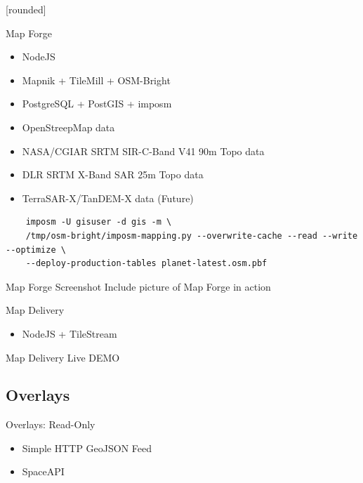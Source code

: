 \documentclass{beamer}
\newcommand\Fontvi{\fontsize{6}{7.2}\selectfont}
\begin{document}
[rounded]
\begin{frame}[fragile]{Map Forge}
 \begin{itemize}
  \item NodeJS
  \item Mapnik + TileMill + OSM-Bright
  \item PostgreSQL + PostGIS + imposm
  \item OpenStreepMap data
  \item NASA/CGIAR SRTM SIR-C-Band V41 90m Topo data
  \item DLR SRTM X-Band SAR 25m Topo data
  \item TerraSAR-X/TanDEM-X data (Future)
 \end{itemize}
\Fontvi
{}
\begin{block}{}
\begin{lstlisting}
    imposm -U gisuser -d gis -m \
    /tmp/osm-bright/imposm-mapping.py --overwrite-cache --read --write --optimize \
    --deploy-production-tables planet-latest.osm.pbf
\end{lstlisting}
\end{block}
\end{frame}

\begin{frame}{Map Forge Screenshot}
Include picture of Map Forge in action
\end{frame}

\begin{frame}{Map Delivery}
 \begin{itemize}
  \item NodeJS + TileStream
 \end{itemize}
\end{frame}

\begin{frame}{Map Delivery}
Live DEMO
\end{frame}

\subsection{Overlays}

\begin{frame}{Overlays: Read-Only}
 \begin{itemize}
  \item Simple HTTP GeoJSON Feed
  \item SpaceAPI
 \end{itemize}
\end{frame}
\end{document}
